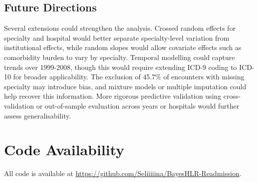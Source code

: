 \documentclass[10pt]{article}
\begin{document}
\subsection{Future Directions}

Several extensions could strengthen the analysis. Crossed random effects for specialty and hospital would better separate specialty-level variation from institutional effects, while random slopes would allow covariate effects such as comorbidity burden to vary by specialty. Temporal modelling could capture trends over 1999-2008, though this would require extending ICD-9 coding to ICD-10 for broader applicability. The exclusion of 45.7\% of encounters with missing specialty may introduce bias, and mixture models or multiple imputation could help recover this information. More rigorous predictive validation using cross-validation or out-of-sample evaluation across years or hospitals would further assess generalisability.

\section*{Code Availability}

All code is available at
\url{https://github.com/Seliiiiina/BayesHLR-Readmission}.
\end{document}
